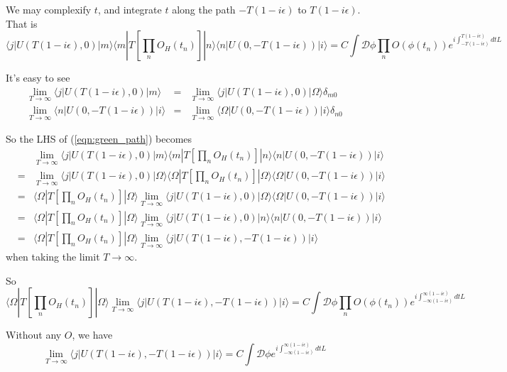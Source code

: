 \documentclass[12pt]{book}
\begin{document}
	We may complexify $t$, and integrate $t$ along the path $-T(1-i\epsilon)$ to $T(1-i\epsilon)$. That is
	\begin{equation}
		\langle j|U(T(1-i\epsilon),0)|m\rangle\langle m|T[\prod_nO_H(t_n)]|n\rangle\langle n|U(0,-T(1-i\epsilon))|i\rangle=C\int \mathcal D \phi\prod_n O(\phi(t_n))e^{i\int_{-T(1-i\epsilon)}^{T(1-i\epsilon)}dtL} \label{eqn:green_path}
	\end{equation}

	It's easy to see
	\begin{eqnarray}
		\lim_{T\rightarrow \infty}\langle j|U(T(1-i\epsilon),0)|m\rangle &=& \lim_{T\rightarrow \infty}\langle j|U(T(1-i\epsilon),0)|\Omega\rangle\delta_{m0}\\
		\lim_{T\rightarrow \infty}\langle n|U(0,-T(1-i\epsilon))|i\rangle &=& \lim_{T\rightarrow \infty}\langle \Omega|U(0,-T(1-i\epsilon))|i\rangle\delta_{n0}
	\end{eqnarray}
	
	So the LHS of (\ref{eqn:green_path}) becomes
	\begin{eqnarray}
		&&\lim_{T\rightarrow \infty}\langle j|U(T(1-i\epsilon),0)|m\rangle\langle m|T[\prod_nO_H(t_n)]|n\rangle\langle n|U(0,-T(1-i\epsilon))|i\rangle\\
		&=&\lim_{T\rightarrow \infty}\langle j|U(T(1-i\epsilon),0)|\Omega\rangle\langle \Omega|T[\prod_nO_H(t_n)]|\Omega\rangle\langle \Omega|U(0,-T(1-i\epsilon))|i\rangle\\
		&=&\langle \Omega|T[\prod_nO_H(t_n)]|\Omega\rangle\lim_{T\rightarrow \infty}\langle j|U(T(1-i\epsilon),0)|\Omega\rangle\langle \Omega|U(0,-T(1-i\epsilon))|i\rangle\\
		&=&\langle \Omega|T[\prod_nO_H(t_n)]|\Omega\rangle\lim_{T\rightarrow \infty}\langle j|U(T(1-i\epsilon),0)|n\rangle\langle n|U(0,-T(1-i\epsilon))|i\rangle\\
		&=&\langle \Omega|T[\prod_nO_H(t_n)]|\Omega\rangle\lim_{T\rightarrow \infty}\langle j|U(T(1-i\epsilon),-T(1-i\epsilon))|i\rangle
	\end{eqnarray}
	when taking the limit $T\rightarrow \infty$.
	
	So
	\begin{equation}
		\langle \Omega|T[\prod_nO_H(t_n)]|\Omega\rangle\lim_{T\rightarrow \infty}\langle j|U(T(1-i\epsilon),-T(1-i\epsilon))|i\rangle=C\int \mathcal D \phi\prod_n O(\phi(t_n))e^{i\int_{-\infty(1-i\epsilon)}^{\infty(1-i\epsilon)}dtL}
	\end{equation}
	
	Without any $O$, we have
	\begin{equation}
		\lim_{T\rightarrow \infty}\langle j|U(T(1-i\epsilon),-T(1-i\epsilon))|i\rangle=C\int \mathcal D \phi e^{i\int_{-\infty(1-i\epsilon)}^{\infty(1-i\epsilon)}dtL}
	\end{equation}
	
\end{document}
